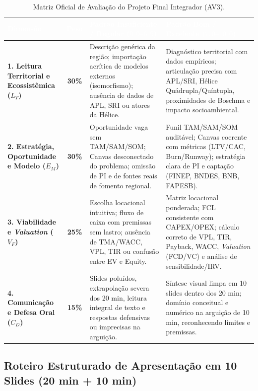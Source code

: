 \begin{table}[H]
\centering
\caption{Matriz Oficial de Avaliação do Projeto Final Integrador (AV3).}
\label{tab:rubrica_av3}
\renewcommand{\arraystretch}{1.22}
\footnotesize
\begin{tabularx}{\textwidth}{@{}p{2.7cm} c >{\raggedright\arraybackslash}X >{\raggedright\arraybackslash}X@{}}
  \toprule
  \rowcolor{etIndigo}
  \textcolor{white}{\bfseries Dimensão} & \textcolor{white}{\bfseries Peso} & \textcolor{white}{\bfseries Padrão Insuficiente / Regular ($0{,}0$–$6{,}9$)} & \textcolor{white}{\bfseries Padrão Bom / Excelente ($7{,}0$–$10{,}0$)} \\
  \midrule
  \textbf{1. Leitura Territorial e Ecossistêmica ($L_T$)} & \textbf{30\%} & Descrição genérica da região; importação acrítica de modelos externos (isomorfismo); ausência de dados de APL, SRI ou atores da Hélice. & Diagnóstico territorial com dados empíricos; articulação precisa com APL/SRI, Hélice Quádrupla/Quíntupla, proximidades de Boschma e impacto socioambiental. \\
  \rowcolor{bgGray}
  \textbf{2. Estratégia, Oportunidade e Modelo ($E_M$)} & \textbf{30\%} & Oportunidade vaga sem TAM/SAM/SOM; Canvas desconectado do problema; omissão de PI e de fontes reais de fomento regional. & Funil TAM/SAM/SOM auditável; Canvas coerente com métricas (LTV/CAC, Burn/Runway); estratégia clara de PI e captação (FINEP, BNDES, BNB, FAPESB). \\
  \textbf{3. Viabilidade e \textit{Valuation} ($V_F$)} & \textbf{25\%} & Escolha locacional intuitiva; fluxo de caixa com premissas sem lastro; ausência de TMA/WACC, VPL, TIR ou confusão entre EV e Equity. & Matriz locacional ponderada; FCL consistente com CAPEX/OPEX; cálculo correto de VPL, TIR, Payback, WACC, \textit{Valuation} (FCD/VC) e análise de sensibilidade/IRV. \\
  \rowcolor{bgGray}
  \textbf{4. Comunicação e Defesa Oral ($C_D$)} & \textbf{15\%} & Slides poluídos, extrapolação severa dos 20 min, leitura integral de texto e respostas defensivas ou imprecisas na arguição. & Síntese visual limpa em 10 slides dentro dos 20 min; domínio conceitual e numérico na arguição de 10 min, reconhecendo limites e premissas. \\
  \bottomrule
\end{tabularx}
\end{table}

\subsection{Roteiro Estruturado de Apresentação em 10 Slides (20 min + 10 min)}

